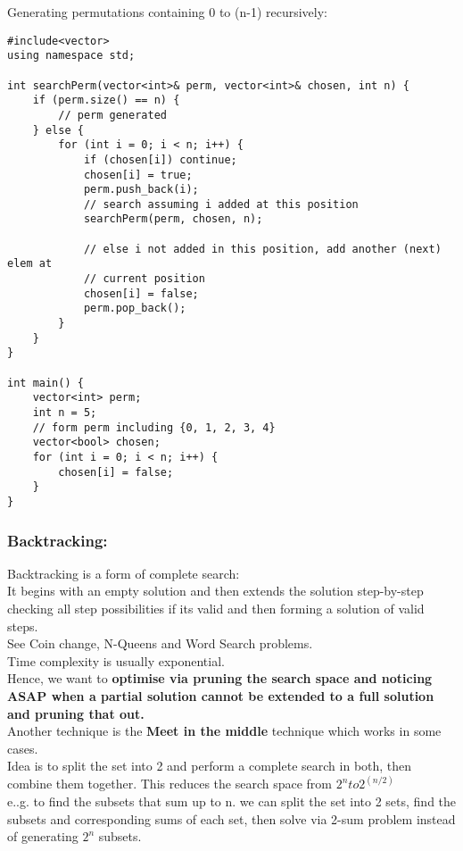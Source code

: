 \documentclass[12pt]{article}
\begin{document}
\noindent Generating permutations containing 0 to (n-1) recursively: 
\begin{verbatim} 
#include<vector> 
using namespace std; 

int searchPerm(vector<int>& perm, vector<int>& chosen, int n) {
    if (perm.size() == n) { 
        // perm generated 
    } else {
        for (int i = 0; i < n; i++) {
            if (chosen[i]) continue; 
            chosen[i] = true; 
            perm.push_back(i); 
            // search assuming i added at this position 
            searchPerm(perm, chosen, n);

            // else i not added in this position, add another (next) elem at 
            // current position
            chosen[i] = false; 
            perm.pop_back(); 
        }
    }
}

int main() {
    vector<int> perm; 
    int n = 5; 
    // form perm including {0, 1, 2, 3, 4} 
    vector<bool> chosen; 
    for (int i = 0; i < n; i++) {
        chosen[i] = false; 
    }
}
\end{verbatim}  

\subsubsection{Backtracking:} 
Backtracking is a form of complete search: \\ 
It begins with an empty solution and then extends the solution step-by-step checking all step possibilities if its valid and then forming a solution of valid steps. \\ 
See Coin change, N-Queens and Word Search problems. \\ 

Time complexity is usually exponential. \\ 
Hence, we want to {\textbf{optimise via pruning the search space and noticing ASAP when a partial solution cannot be extended to a full solution and pruning that out.}} \\

Another technique is the {\textbf{Meet in the middle}} technique which works in some cases. \\ 

Idea is to split the set into 2 and perform a complete search in both, then combine them together. This reduces the search space from \(2^n to 2^(n/2)\) \\
e..g. to find the subsets that sum up to n. we can split the set into 2 sets, find the subsets and corresponding sums of each set, then solve via 2-sum problem instead of generating \(2^n\) subsets. 
\end{document}
